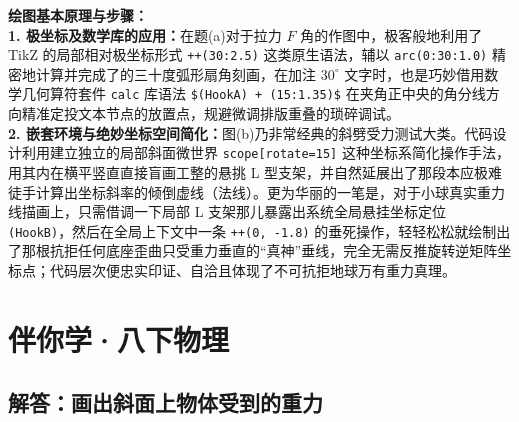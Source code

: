 \vspace{0.6cm}

{\small\color{blue!70!black}
\textbf{绘图基本原理与步骤：}\\
\textbf{1. 极坐标及数学库的应用：}在题(a)对于拉力 $F$ 角的作图中，极客般地利用了 TikZ 的局部相对极坐标形式 \texttt{++(30:2.5)} 这类原生语法，辅以 \texttt{arc(0:30:1.0)} 精密地计算并完成了的三十度弧形扇角刻画，在加注 $30^\circ$ 文字时，也是巧妙借用数学几何算符套件 \texttt{calc} 库语法 \texttt{\$(HookA) + (15:1.35)\$} 在夹角正中央的角分线方向精准定投文本节点的放置点，规避微调排版重叠的琐碎调试。\\
\textbf{2. 嵌套环境与绝妙坐标空间简化：}图(b)乃非常经典的斜劈受力测试大类。代码设计利用建立独立的局部斜面微世界 \texttt{scope[rotate=15]} 这种坐标系简化操作手法，用其内在横平竖直直接盲画工整的悬挑 L 型支架，并自然延展出了那段本应极难徒手计算出坐标斜率的倾倒虚线（法线）。更为华丽的一笔是，对于小球真实重力线描画上，只需借调一下局部 L 支架那儿暴露出系统全局悬挂坐标定位 \texttt{(HookB)}，然后在全局上下文中一条 \texttt{++(0, -1.8)} 的垂死操作，轻轻松松就绘制出了那根抗拒任何底座歪曲只受重力垂直的“真神”垂线，完全无需反推旋转逆矩阵坐标点；代码层次便忠实印证、自洽且体现了不可抗拒地球万有重力真理。
}


\chapter{伴你学·八下物理}



\section{解答：画出斜面上物体受到的重力}

\vspace{0.6cm}

